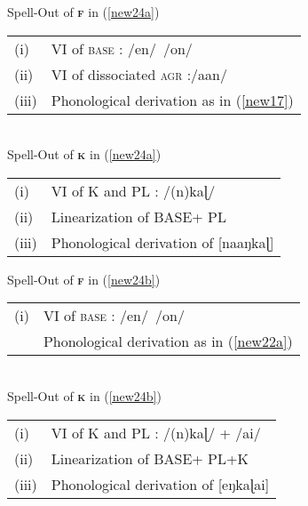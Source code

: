 \documentclass[output=paper]{langscibook}
\begin{document}
\begin{exe}
\ex
\begin{xlist}
    \ex \label{new24c}
    Spell-Out of \textsc{\textbf{f}} in (\ref{new24a}) \rightarrow\ 
    \begin{tabular}[t]{@{}ll@{}} (i) & VI of \textsc{base} : /en/~/on/ \\
                                     (ii) & VI of dissociated \textsc{agr} :/aan/ \\
                                     (iii) & Phonological derivation as in (\ref{new17}) \\\end{tabular}\smallskip\\
    Spell-Out of \textsc{\textbf{k}} in (\ref{new24a}) \rightarrow\ \begin{tabular}[t]{@{}ll@{}} (i) & VI of K and PL : /(n)kaɭ/ \\
                                                                                      (ii) & Linearization of BASE+ PL \\
                                                                                     (iii) & Phonological derivation of [naaŋkaɭ]\\
                                                                                     \end{tabular}
         
    \ex \label{new24d}
    Spell-Out of \textsc{\textbf{f}} in (\ref{new24b}) \rightarrow\ \begin{tabular}[t]{@{}ll@{}} (i) & VI of \textsc{base} : /en/~/on/ \\
                                                                    & Phonological derivation as in (\ref{new22a}) \\\end{tabular}\smallskip\\
     Spell-Out of \textsc{\textbf{k}} in (\ref{new24b})  \rightarrow\ \begin{tabular}[t]{@{}ll@{}} (i) & VI of K and PL : /(n)kaɭ/ + /ai/ \\
                                                                     (ii)  & Linearization of BASE+ PL+K \\
                                                                     (iii) & Phonological derivation of [eŋkaɭai] \end{tabular}
    \end{xlist}
\end{exe}
\end{document}
